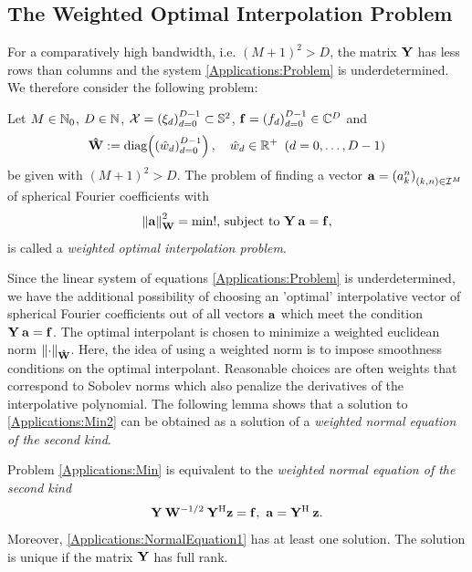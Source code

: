 \subsection{The Weighted Optimal Interpolation Problem}
  For a comparatively high bandwidth, i.e. $(M+1)^2 > D$, the matrix $\mathbf{Y}$ 
  has less rows than columns and the system \eqref{Applications:Problem} is 
  underdetermined. We therefore consider the following problem:
  \begin{definition}
    Let $M \in \mathbb{N}_{0}$, $D \in \mathbb{N}$, $\mathcal{X}=\left(\mathbf{\xi}_{d}\right)_{d=0}^{D-1} \subset \mathbb{S}^2$, 
    $\mathbf{f}=\left(f_{d}\right)_{d=0}^{D-1} \in \mathbb{C}^{D}$ and 
    \[
      \V{\hat{W}} := \fun{\diag}{\paren{\hat{w}_{d}}_{d=0}^{D-1}},\quad \hat{w}_{d} \in \Rp \ \paren{d=0,\ldots,D-1}
    \]
    be given with $(M+1)^2 > D$. The problem of finding a vector $\mathbf{a}=\left(a_{k}^n\right)_{(k,n) 
    \in \mathcal{I}^M}$ of spherical Fourier coefficients with
    \begin{equation}
      \label{Applications:Min2}
      \left\|\mathbf{a}\right\|_{\mathbf{W}}^2 = \text{min!, subject to } \mathbf{Y}\:\mathbf{a} = \mathbf{f},
    \end{equation}
    is called a \emph{weighted optimal interpolation problem}.
  \end{definition}
  Since the linear system of equations \eqref{Applications:Problem} is underdetermined, we have the 
  additional possibility of choosing an 'optimal' interpolative vector of spherical Fourier coefficients 
  out of all vectors $\mathbf{a}$ which meet the condition $\mathbf{Y}\:\mathbf{a} = \mathbf{f}$. The optimal 
  interpolant is chosen to minimize a weighted euclidean norm $\left\|\cdot\right\|_{\mathbf{\hat{W}}}$. 
  Here, the idea of using a weighted norm is to impose smoothness conditions on the optimal interpolant. 
  Reasonable choices are often weights that correspond to Sobolev norms which also penalize the derivatives
  of the interpolative polynomial. The following lemma shows that a solution to
  \eqref{Applications:Min2} can be obtained as a solution of a 
  \emph{weighted normal equation of the second kind}.
  \begin{lemma}
    Problem \eqref{Applications:Min} is equivalent to the 
    \emph{weighted normal equation of the second kind}
    \begin{equation}
      \label{Applications:NormalEquation1}
      \mathbf{Y} \: \mathbf{W}^{-1/2} \: \mathbf{Y}^{\text{\rm{H}}} \mathbf{z} = \mathbf{f},\ \mathbf{a} = \mathbf{Y}^{\text{\rm{H}}}\:\mathbf{z}.
    \end{equation}
    Moreover, \eqref{Applications:NormalEquation1} has at least one solution.
    The solution is unique if the matrix $\mathbf{Y}$ has full rank.
  \end{lemma}
